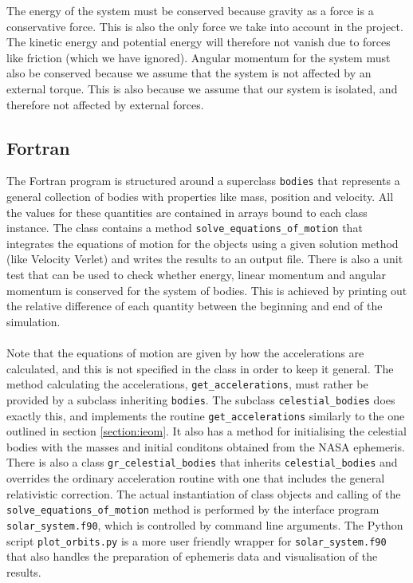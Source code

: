 \documentclass{article}
\begin{document}
\begin{itemize}
The energy of the system must be conserved because gravity as a force is a conservative force. This is also the only force we take into account in the project. The kinetic energy and potential energy will therefore not vanish due to forces like friction (which we have ignored). Angular momentum for the system must also be conserved because we assume that the system is not affected by an external torque. This is also because we assume that our system is isolated, and therefore not affected by external forces.
\end{itemize}

\subsection{Fortran}
The Fortran program is structured around a superclass \texttt{bodies} that represents a general collection of bodies with properties like mass, position and velocity. All the values for these quantities are contained in arrays bound to each class instance. The class contains a method \texttt{solve\_equations\_of\_motion} that integrates the equations of motion for the objects using a given solution method (like Velocity Verlet) and writes the results to an output file. There is also a unit test that can be used to check whether energy, linear momentum and angular momentum is conserved for the system of bodies. This is achieved by printing out the relative difference of each quantity between the beginning and end of the simulation. \\\\
Note that the equations of motion are given by how the accelerations are calculated, and this is not specified in the class in order to keep it general. The method calculating the accelerations, \texttt{get\_accelerations}, must rather be provided by a subclass inheriting \texttt{bodies}. The subclass \texttt{celestial\_bodies} does exactly this, and implements the routine \texttt{get\_accelerations} similarly to the one outlined in section \ref{section:ieom}. It also has a method for initialising the celestial bodies with the masses and initial conditons obtained from the NASA ephemeris. There is also a class \texttt{gr\_celestial\_bodies} that inherits \texttt{celestial\_bodies} and overrides the ordinary acceleration routine with one that includes the general relativistic correction. The actual instantiation of class objects and calling of the \texttt{solve\_equations\_of\_motion} method is performed by the interface program \texttt{solar\_system.f90}, which is controlled by command line arguments. The Python script \texttt{plot\_orbits.py} is a more user friendly wrapper for \texttt{solar\_system.f90} that also handles the preparation of ephemeris data and visualisation of the results.
\end{document}
